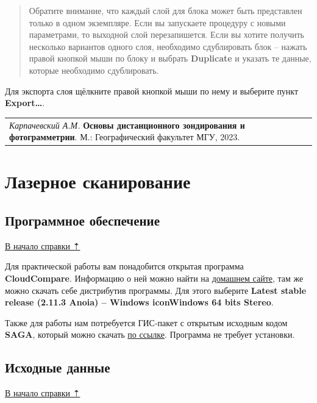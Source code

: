 \documentclass[
  12pt,
]{book}
\begin{document}
\begin{quote}
Обратите внимание, что каждый слой для блока может быть представлен только в одном экземпляре. Если вы запускаете процедуру с новыми параметрами, то выходной слой перезапишется. Если вы хотите получить несколько вариантов одного слоя, необходимо сдублировать блок -- нажать правой кнопкой мыши по блоку и выбрать \textbf{Duplicate} и указать те данные, которые необходимо сдублировать.
\end{quote}

Для экспорта слоя щёлкните правой кнопкой мыши по нему и выберите пункт \textbf{Export\ldots{}}.

\begin{longtable}[]{@{}l@{}}
\toprule\noalign{}
\endhead
\bottomrule\noalign{}
\endlastfoot
\emph{Карпачевский А.М.} \textbf{Основы дистанционного зондирования и фотограмметрии}. М.: Географический факультет МГУ, 2023. \\
\end{longtable}

\hypertarget{las}{%
\chapter{Лазерное сканирование}\label{las}}

\hypertarget{las-soft}{%
\section{Программное обеспечение}\label{las-soft}}

\protect\hyperlink{las}{В начало справки ⇡}

Для практической работы вам понадобится открытая программа \textbf{CloudCompare}. Информацию о ней можно найти на \href{https://www.danielgm.net/cc/}{домашнем сайте}, там же можно скачать себе дистрибутив программы. Для этого выберите \textbf{Latest stable release (2.11.3 Anoia) -- Windows iconWindows 64 bits Stereo}.

Также для работы нам потребуется ГИС-пакет с открытым исходным кодом \textbf{SAGA}, который можно скачать \href{https://sourceforge.net/projects/saga-gis/files/latest/download}{по ссылке}. Программа не требует установки.

\hypertarget{las-initial}{%
\section{Исходные данные}\label{las-initial}}

\protect\hyperlink{las}{В начало справки ⇡}
\end{document}
